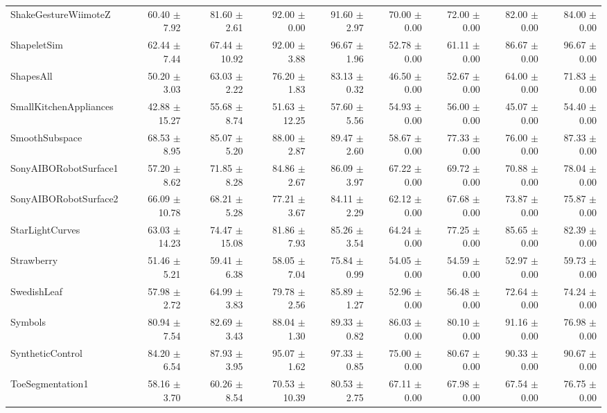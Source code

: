 \begin{landscape}
\begin{longtable}{lrrrrrrrr}
ShakeGestureWiimoteZ & 60.40 $\pm$ 7.92 & 81.60 $\pm$ 2.61 & 92.00 $\pm$ 0.00 & 91.60 $\pm$ 2.97 & 70.00 $\pm$ 0.00 & 72.00 $\pm$ 0.00 & 82.00 $\pm$ 0.00 & 84.00 $\pm$ 0.00 \\
ShapeletSim & 62.44 $\pm$ 7.44 & 67.44 $\pm$ 10.92 & 92.00 $\pm$ 3.88 & 96.67 $\pm$ 1.96 & 52.78 $\pm$ 0.00 & 61.11 $\pm$ 0.00 & 86.67 $\pm$ 0.00 & 96.67 $\pm$ 0.00 \\
ShapesAll & 50.20 $\pm$ 3.03 & 63.03 $\pm$ 2.22 & 76.20 $\pm$ 1.83 & 83.13 $\pm$ 0.32 & 46.50 $\pm$ 0.00 & 52.67 $\pm$ 0.00 & 64.00 $\pm$ 0.00 & 71.83 $\pm$ 0.00 \\
SmallKitchenAppliances & 42.88 $\pm$ 15.27 & 55.68 $\pm$ 8.74 & 51.63 $\pm$ 12.25 & 57.60 $\pm$ 5.56 & 54.93 $\pm$ 0.00 & 56.00 $\pm$ 0.00 & 45.07 $\pm$ 0.00 & 54.40 $\pm$ 0.00 \\
SmoothSubspace & 68.53 $\pm$ 8.95 & 85.07 $\pm$ 5.20 & 88.00 $\pm$ 2.87 & 89.47 $\pm$ 2.60 & 58.67 $\pm$ 0.00 & 77.33 $\pm$ 0.00 & 76.00 $\pm$ 0.00 & 87.33 $\pm$ 0.00 \\
SonyAIBORobotSurface1 & 57.20 $\pm$ 8.62 & 71.85 $\pm$ 8.28 & 84.86 $\pm$ 2.67 & 86.09 $\pm$ 3.97 & 67.22 $\pm$ 0.00 & 69.72 $\pm$ 0.00 & 70.88 $\pm$ 0.00 & 78.04 $\pm$ 0.00 \\
SonyAIBORobotSurface2 & 66.09 $\pm$ 10.78 & 68.21 $\pm$ 5.28 & 77.21 $\pm$ 3.67 & 84.11 $\pm$ 2.29 & 62.12 $\pm$ 0.00 & 67.68 $\pm$ 0.00 & 73.87 $\pm$ 0.00 & 75.87 $\pm$ 0.00 \\
StarLightCurves & 63.03 $\pm$ 14.23 & 74.47 $\pm$ 15.08 & 81.86 $\pm$ 7.93 & 85.26 $\pm$ 3.54 & 64.24 $\pm$ 0.00 & 77.25 $\pm$ 0.00 & 85.65 $\pm$ 0.00 & 82.39 $\pm$ 0.00 \\
Strawberry & 51.46 $\pm$ 5.21 & 59.41 $\pm$ 6.38 & 58.05 $\pm$ 7.04 & 75.84 $\pm$ 0.99 & 54.05 $\pm$ 0.00 & 54.59 $\pm$ 0.00 & 52.97 $\pm$ 0.00 & 59.73 $\pm$ 0.00 \\
SwedishLeaf & 57.98 $\pm$ 2.72 & 64.99 $\pm$ 3.83 & 79.78 $\pm$ 2.56 & 85.89 $\pm$ 1.27 & 52.96 $\pm$ 0.00 & 56.48 $\pm$ 0.00 & 72.64 $\pm$ 0.00 & 74.24 $\pm$ 0.00 \\
Symbols & 80.94 $\pm$ 7.54 & 82.69 $\pm$ 3.43 & 88.04 $\pm$ 1.30 & 89.33 $\pm$ 0.82 & 86.03 $\pm$ 0.00 & 80.10 $\pm$ 0.00 & 91.16 $\pm$ 0.00 & 76.98 $\pm$ 0.00 \\
SyntheticControl & 84.20 $\pm$ 6.54 & 87.93 $\pm$ 3.95 & 95.07 $\pm$ 1.62 & 97.33 $\pm$ 0.85 & 75.00 $\pm$ 0.00 & 80.67 $\pm$ 0.00 & 90.33 $\pm$ 0.00 & 90.67 $\pm$ 0.00 \\
ToeSegmentation1 & 58.16 $\pm$ 3.70 & 60.26 $\pm$ 8.54 & 70.53 $\pm$ 10.39 & 80.53 $\pm$ 2.75 & 67.11 $\pm$ 0.00 & 67.98 $\pm$ 0.00 & 67.54 $\pm$ 0.00 & 76.75 $\pm$ 0.00 \\

\end{longtable}
\end{landscape}
